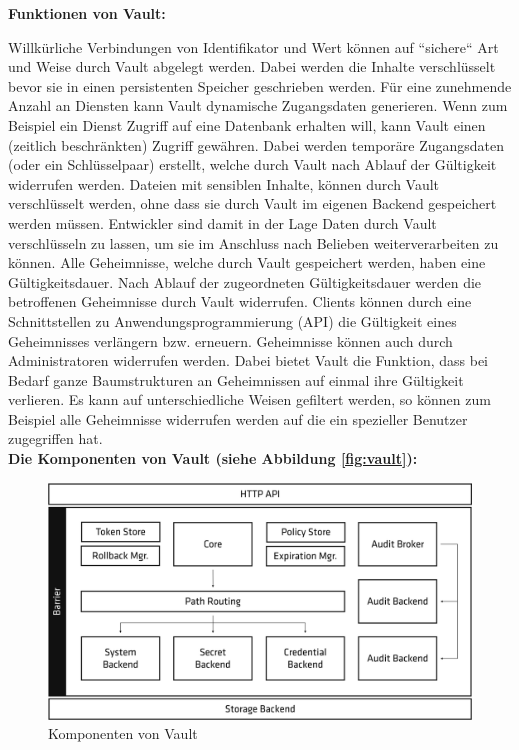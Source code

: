 \documentclass[
book,
a4paper,   
titlepage,  
halfparskip,
12pt        
]{scrartcl}
\begin{document}
\begin{onehalfspacing}
\textbf{Funktionen von Vault:}

Willkürliche Verbindungen von Identifikator und Wert können auf ``sichere`` Art und Weise durch Vault abgelegt werden. Dabei werden die Inhalte verschlüsselt bevor sie in einen persistenten Speicher geschrieben werden.
Für eine zunehmende Anzahl an Diensten kann Vault dynamische Zugangsdaten generieren. Wenn zum Beispiel ein Dienst Zugriff auf eine Datenbank erhalten will, kann Vault einen (zeitlich beschränkten) Zugriff gewähren. Dabei werden temporäre Zugangsdaten (oder ein Schlüsselpaar) erstellt, welche durch Vault nach Ablauf der Gültigkeit widerrufen werden.
Dateien mit sensiblen Inhalte, können durch Vault verschlüsselt werden, ohne dass sie durch Vault im eigenen Backend gespeichert werden müssen. Entwickler sind damit in der Lage Daten durch Vault verschlüsseln zu lassen, um sie im Anschluss nach Belieben weiterverarbeiten zu können.\cite{vaultintro}\newline
Alle Geheimnisse, welche durch Vault gespeichert werden, haben eine Gültigkeitsdauer. Nach Ablauf der zugeordneten Gültigkeitsdauer werden die betroffenen Geheimnisse durch Vault widerrufen. Clients können durch eine Schnittstellen zu Anwendungsprogrammierung (API) die Gültigkeit eines Geheimnisses verlängern bzw. erneuern.
Geheimnisse können auch durch Administratoren widerrufen werden. Dabei bietet Vault die Funktion, dass bei Bedarf ganze Baumstrukturen an Geheimnissen auf einmal ihre Gültigkeit verlieren. Es kann auf unterschiedliche Weisen gefiltert werden, so können zum Beispiel alle Geheimnisse widerrufen werden auf die ein spezieller Benutzer zugegriffen hat.\cite{vaultintro}\\

\textbf{Die Komponenten von Vault (siehe Abbildung \vref{fig:vault}):}

\begin{figure}[h]
	\centering
	\includegraphics[width=1\linewidth]{vault.png}
	\caption[Vault]{Komponenten von Vault\cite{vault}}
	\label{fig:vault}
\end{figure}


\end{onehalfspacing}
\end{document}
